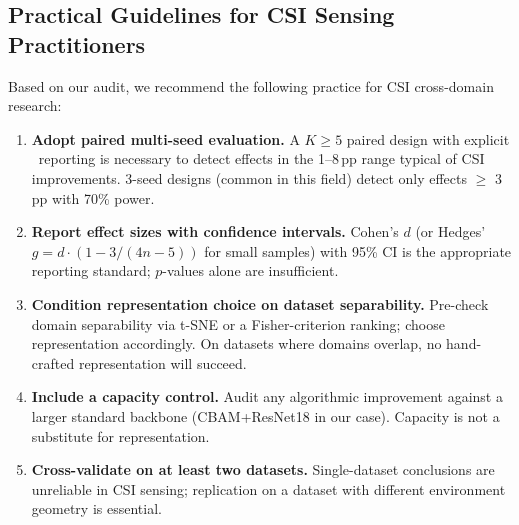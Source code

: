 \documentclass[journal,11pt]{IEEEtran}
\newcommand{\MDE}{\text{MDE}}
\begin{document}
\subsection{Practical Guidelines for CSI Sensing Practitioners}
Based on our audit, we recommend the following practice for CSI cross-domain research:
\begin{enumerate}
    \item \textbf{Adopt paired multi-seed evaluation.} A $K \geq 5$ paired design with explicit \MDE\ reporting is necessary to detect effects in the 1--8\,pp range typical of CSI improvements. 3-seed designs (common in this field) detect only effects $\geq$ 3\,pp with 70\% power.
    \item \textbf{Report effect sizes with confidence intervals.} Cohen's $d$ (or Hedges' $g = d \cdot (1 - 3/(4n - 5))$ for small samples) with 95\% CI is the appropriate reporting standard; $p$-values alone are insufficient.
    \item \textbf{Condition representation choice on dataset separability.} Pre-check domain separability via t-SNE or a Fisher-criterion ranking; choose representation accordingly. On datasets where domains overlap, no hand-crafted representation will succeed.
    \item \textbf{Include a capacity control.} Audit any algorithmic improvement against a larger standard backbone (CBAM+ResNet18 in our case). Capacity is not a substitute for representation.
    \item \textbf{Cross-validate on at least two datasets.} Single-dataset conclusions are unreliable in CSI sensing; replication on a dataset with different environment geometry is essential.
\end{enumerate}
\end{document}
